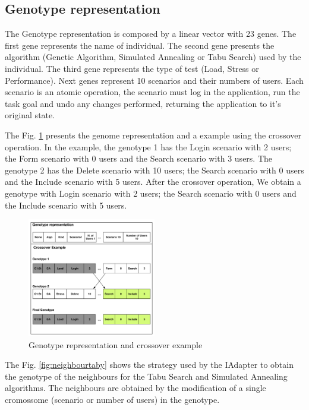 \subsection{Genotype representation}

The Genotype representation is composed by a linear vector with 23 genes. The first gene represents the name of individual. The second gene presents the  algorithm (Genetic Algorithm, Simulated Annealing or Tabu Search) used by the individual. The third gene represents the type of test (Load, Stress or Performance). Next genes represent 10 scenarios and their numbers of users. Each scenario is an atomic operation, the scenario must log in the application, run the task goal and undo any changes performed, returning the application to it's original state. 

The Fig. \ref{fig:genomarepresentation} presents the genome representation and  a example using the crossover operation. In the example, the genotype 1 has the Login scenario with 2 users; the Form scenario with 0 users and the Search scenario with 3 users. The genotype 2 has the Delete scenario with 10 users; the Search scenario with 0 users and the Include scenario with 5 users. After the crossover operation, We obtain a genotype with  Login scenario with 2 users; the Search scenario with 0 users and the Include scenario with 5 users.

\begin{figure}[h]
\includegraphics[width=0.5\textwidth]{./images/genomerepresentation.png}
\caption{Genotype representation and crossover example}
\label{fig:genomarepresentation}
\end{figure}

The Fig. \ref{fig:neighbourtaby} shows the strategy used by the IAdapter to obtain the genotype of the neighbours for the Tabu Search and Simulated Annealing algorithms.  The neighbours are obtained by the modification of a single cromossome (scenario or  number of users) in the genotype.

